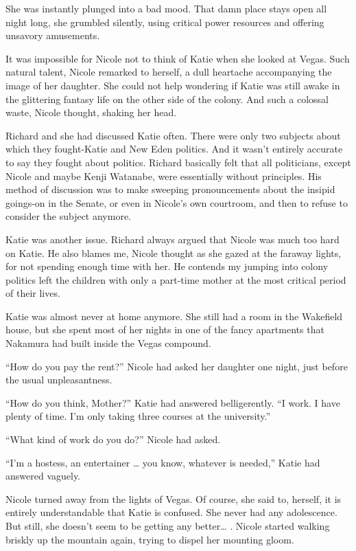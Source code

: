 \documentclass[]{article}
\begin{document}
{She was instantly plunged into a bad mood.  That damn place stays open all night long, she grumbled silently, using critical power resources and offering unsavory amusements.

It was impossible for Nicole not to think of Katie when she looked at Vegas.  Such natural talent, Nicole remarked to herself, a dull heartache accompanying the image of her daughter.  She could not help wondering if Katie was still awake in the glittering fantasy life on the other side of the colony.  And such a colossal waste, Nicole thought, shaking her head.

Richard and she had discussed Katie often.  There were only two subjects about which they fought-Katie and New Eden politics.  And it wasn’t entirely accurate to say they fought about politics.  Richard basically felt that all politicians, except Nicole and maybe Kenji Watanabe, were essentially without principles.  His method of discussion was to make sweeping pronouncements about the insipid goings-on in the Senate, or even in Nicole’s own courtroom, and then to refuse to consider the subject anymore.

Katie was another issue.  Richard always argued that Nicole was much too hard on Katie.  He also blames me, Nicole thought as she gazed at the faraway lights, for not spending enough time with her.  He contends my jumping into colony politics left the children with only a part-time mother at the most critical period of their lives.

Katie was almost never at home anymore.  She still had a room in the Wakefield house, but she spent most of her nights in one of the fancy apartments that Nakamura had built inside the Vegas compound.

“How do you pay the rent?” Nicole had asked her daughter one night, just before the usual unpleasantness.

“How do you think, Mother?” Katie had answered belligerently.  “I work.  I have plenty of time.  I’m only taking three courses at the university.”

“What kind of work do you do?” Nicole had asked.

“I’m a hostess, an entertainer … you know, whatever is needed,” Katie had answered vaguely.

Nicole turned away from the lights of Vegas.  Of course, she said to, herself, it is entirely understandable that Katie is confused.  She never had any adolescence.  But still, she doesn’t seem to be getting any better… .  Nicole started walking briskly up the mountain again, trying to dispel her mounting gloom.

}
\end{document}
